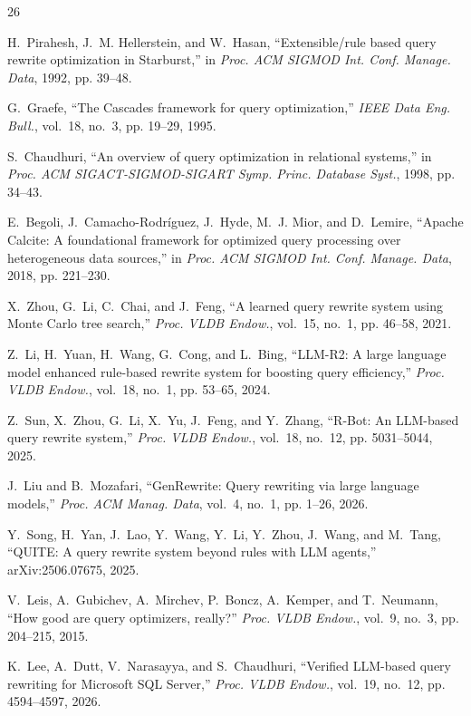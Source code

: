 \documentclass[conference]{IEEEtran}
\begin{document}
\begin{thebibliography}{26}

H.~Pirahesh, J.~M. Hellerstein, and W.~Hasan, ``Extensible/rule based query rewrite optimization in Starburst,'' in \emph{Proc. ACM SIGMOD Int. Conf. Manage. Data}, 1992, pp. 39--48.

G.~Graefe, ``The Cascades framework for query optimization,'' \emph{IEEE Data Eng. Bull.}, vol.~18, no.~3, pp. 19--29, 1995.

S.~Chaudhuri, ``An overview of query optimization in relational systems,'' in \emph{Proc. ACM SIGACT-SIGMOD-SIGART Symp. Princ. Database Syst.}, 1998, pp. 34--43.

E.~Begoli, J.~Camacho-Rodr\'iguez, J.~Hyde, M.~J. Mior, and D.~Lemire, ``Apache Calcite: A foundational framework for optimized query processing over heterogeneous data sources,'' in \emph{Proc. ACM SIGMOD Int. Conf. Manage. Data}, 2018, pp. 221--230.

X.~Zhou, G.~Li, C.~Chai, and J.~Feng, ``A learned query rewrite system using Monte Carlo tree search,'' \emph{Proc. VLDB Endow.}, vol.~15, no.~1, pp. 46--58, 2021.

Z.~Li, H.~Yuan, H.~Wang, G.~Cong, and L.~Bing, ``LLM-R2: A large language model enhanced rule-based rewrite system for boosting query efficiency,'' \emph{Proc. VLDB Endow.}, vol.~18, no.~1, pp. 53--65, 2024.

Z.~Sun, X.~Zhou, G.~Li, X.~Yu, J.~Feng, and Y.~Zhang, ``R-Bot: An LLM-based query rewrite system,'' \emph{Proc. VLDB Endow.}, vol.~18, no.~12, pp. 5031--5044, 2025.

J.~Liu and B.~Mozafari, ``GenRewrite: Query rewriting via large language models,'' \emph{Proc. ACM Manag. Data}, vol.~4, no.~1, pp. 1--26, 2026.

Y.~Song, H.~Yan, J.~Lao, Y.~Wang, Y.~Li, Y.~Zhou, J.~Wang, and M.~Tang, ``QUITE: A query rewrite system beyond rules with LLM agents,'' arXiv:2506.07675, 2025.

V.~Leis, A.~Gubichev, A.~Mirchev, P.~Boncz, A.~Kemper, and T.~Neumann, ``How good are query optimizers, really?'' \emph{Proc. VLDB Endow.}, vol.~9, no.~3, pp. 204--215, 2015.

K.~Lee, A.~Dutt, V.~Narasayya, and S.~Chaudhuri, ``Verified LLM-based query rewriting for Microsoft SQL Server,'' \emph{Proc. VLDB Endow.}, vol.~19, no.~12, pp. 4594--4597, 2026.


\end{thebibliography}
\end{document}
